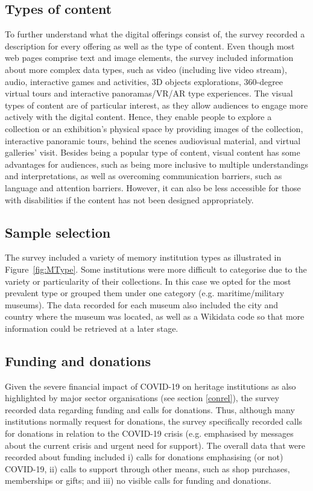 \documentclass{egpubl}
\begin{document}
\subsection{Types of content}
\label{typ}
To further understand what the digital offerings consist of, the survey recorded a description for every offering as well as the type of content. Even though most web pages comprise text and image elements, the survey included information about more complex data types, such as video (including live video stream), audio, interactive games and activities, 3D objects explorations, 360-degree virtual tours and interactive panoramas/VR/AR type experiences.
The visual types of content are of particular interest, as they allow audiences to engage more actively with the digital content. Hence, they enable people to explore a collection or an exhibition's physical space by providing images of the collection, interactive panoramic tours, behind the scenes audiovisual material, and virtual galleries' visit. Besides being a popular type of content, visual content has some advantages for audiences, such as being more inclusive to multiple understandings and interpretations, as well as overcoming communication barriers, such as language and attention barriers. However, it can also be less accessible for those with disabilities if the content has not been designed appropriately.

\subsection{Sample selection}
The survey included a variety of memory institution types as illustrated in Figure~\ref{fig:MType}. Some institutions were more difficult to categorise due to the variety or particularity of their collections. In this case we opted for the most prevalent type or grouped them under one category (e.g. maritime/military museums). The data recorded for each museum also included the city and country where the museum was located, as well as a Wikidata code so that more information could be retrieved at a later stage.

\subsection{Funding and donations}
\label{fund}
Given the severe financial impact of COVID-19 on heritage institutions as also highlighted by major sector organisations (see section \ref{conrel}), the survey recorded data regarding funding and calls for donations. Thus, although many institutions normally request for donations, the survey specifically recorded calls for donations in relation to the COVID-19 crisis (e.g. emphasised by messages about the current crisis and urgent need for support). The overall data that were recorded about funding included i) calls for donations emphasising (or not)  COVID-19, ii) calls to support through other means, such as shop purchases, memberships or gifts; and iii) no visible calls for funding and donations.
\end{document}
